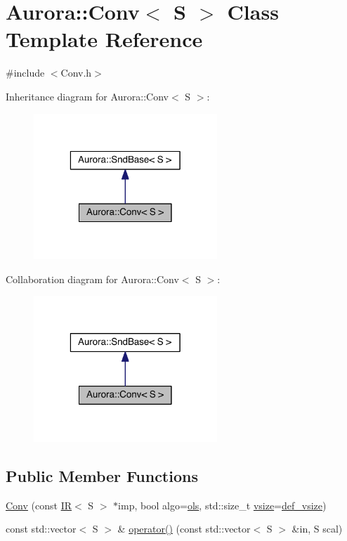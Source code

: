 \hypertarget{class_aurora_1_1_conv}{}\section{Aurora\+:\+:Conv$<$ S $>$ Class Template Reference}
\label{class_aurora_1_1_conv}


{\ttfamily \#include $<$Conv.\+h$>$}



Inheritance diagram for Aurora\+:\+:Conv$<$ S $>$\+:\nopagebreak
\begin{figure}[H]
\begin{center}
\leavevmode
\includegraphics[width=196pt]{class_aurora_1_1_conv__inherit__graph}
\end{center}
\end{figure}


Collaboration diagram for Aurora\+:\+:Conv$<$ S $>$\+:\nopagebreak
\begin{figure}[H]
\begin{center}
\leavevmode
\includegraphics[width=196pt]{class_aurora_1_1_conv__coll__graph}
\end{center}
\end{figure}
\subsection*{Public Member Functions}
\begin{DoxyCompactItemize}
\item 
\hyperlink{class_aurora_1_1_conv_a55fda098ad783bd6283fed023d3129b1}{Conv} (const \hyperlink{class_aurora_1_1_i_r}{IR}$<$ S $>$ $\ast$imp, bool algo=\hyperlink{namespace_aurora_a4e816792565225ccd6ba67110f75fb8b}{ols}, std\+::size\+\_\+t \hyperlink{class_aurora_1_1_snd_base_af9e21aaf411b17f7a8221c991ce5d291}{vsize}=\hyperlink{namespace_aurora_afaaddf667a06e7ce23c667a8b7295263}{def\+\_\+vsize})
\item 
const std\+::vector$<$ S $>$ \& \hyperlink{class_aurora_1_1_conv_aeefccb7a11338388723bb78e025ad030}{operator()} (const std\+::vector$<$ S $>$ \&in, S scal)
\end{DoxyCompactItemize}



